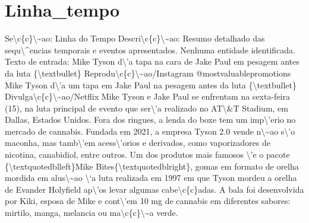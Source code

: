 \documentclass{article}%
\begin{document}
\section{Linha\_tempo}%
\label{sec:Linhatempo}%
Se\textbackslash{}c\{c\}\textbackslash{}\textasciitilde{}ao: Linha do Tempo\newline%
Descri\textbackslash{}c\{c\}\textbackslash{}\textasciitilde{}ao: Resumo detalhado das sequ\textbackslash{}\^{}encias temporais e eventos apresentados.\newline%
\newline%
Nenhuma entidade identificada.\newline%
\newline%
Texto de entrada:\newline%
Mike Tyson d\textbackslash{}'a tapa na cara de Jake Paul em pesagem antes da luta\newline%
\{\textbackslash{}textbullet\} Reprodu\textbackslash{}c\{c\}\textbackslash{}\textasciitilde{}ao/Instagram @mostvaluablepromotions\newline%
\newline%
Mike Tyson d\textbackslash{}'a um tapa em Jake Paul na pesagem antes da luta\newline%
\{\textbackslash{}textbullet\} Divulga\textbackslash{}c\{c\}\textbackslash{}\textasciitilde{}ao/Netflix\newline%
\newline%
Mike Tyson e Jake Paul se enfrentam na sexta{-}feira (15), na luta principal de evento que ser\textbackslash{}'a realizado no AT\textbackslash{}\&T Stadium, em Dallas, Estados Unidos. Fora dos ringues, a lenda do boxe tem um imp\textbackslash{}'erio no mercado de cannabis.\newline%
\newline%
Fundada em 2021, a empresa Tyson 2.0 vende n\textbackslash{}\textasciitilde{}ao s\textbackslash{}'o maconha, mas tamb\textbackslash{}'em acess\textbackslash{}'orios e derivados, como vaporizadores de nicotina, canabidiol, entre outros. Um dos produtos mais famosos \textbackslash{}'e o pacote \{\textbackslash{}textquotedblleft\}Mike Bites\{\textbackslash{}textquotedblright\}, gomas em formato de orelha mordida em alus\textbackslash{}\textasciitilde{}ao \textbackslash{}`a luta realizada em 1997 em que Tyson mordeu a orelha de Evander Holyfield ap\textbackslash{}'os levar algumas cabe\textbackslash{}c\{c\}adas.\newline%
\newline%
A bala foi desenvolvida por Kiki, esposa de Mike e cont\textbackslash{}'em 10 mg de cannabis em diferentes sabores: mirtilo, manga, melancia ou ma\textbackslash{}c\{c\}\textbackslash{}\textasciitilde{}a verde.\newline%
\end{document}
